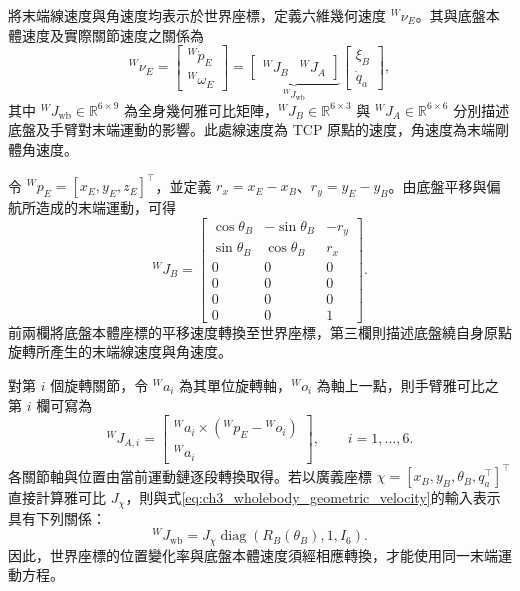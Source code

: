 將末端線速度與角速度均表示於世界座標，定義六維幾何速度 ${}^{W}\nu_E$。其與底盤本體速度及實際關節速度之關係為
\begin{equation}
    {}^{W}\nu_E
    =
    \begin{bmatrix}
        {}^{W}\dot{p}_E \\
        {}^{W}\omega_E
    \end{bmatrix}
    =
    \underbrace{
    \begin{bmatrix}
        {}^{W}J_B & {}^{W}J_A
    \end{bmatrix}}_{{}^{W}J_{\mathrm{wb}}}
    \begin{bmatrix}
        \xi_B \\
        \dot{q}_a
    \end{bmatrix},
    \label{eq:ch3_wholebody_geometric_velocity}
\end{equation}
其中 ${}^{W}J_{\mathrm{wb}}\in\mathbb{R}^{6\times 9}$ 為全身幾何雅可比矩陣，${}^{W}J_B\in\mathbb{R}^{6\times 3}$ 與 ${}^{W}J_A\in\mathbb{R}^{6\times 6}$ 分別描述底盤及手臂對末端運動的影響。此處線速度為 TCP 原點的速度，角速度為末端剛體角速度。

令 ${}^{W}p_E=[x_E,y_E,z_E]^{\top}$，並定義 $r_x=x_E-x_B$、$r_y=y_E-y_B$。由底盤平移與偏航所造成的末端運動，可得
\begin{equation}
    {}^{W}J_B=
    \begin{bmatrix}
        \cos\theta_B & -\sin\theta_B & -r_y \\
        \sin\theta_B & \cos\theta_B & r_x \\
        0 & 0 & 0 \\
        0 & 0 & 0 \\
        0 & 0 & 0 \\
        0 & 0 & 1
    \end{bmatrix}.
    \label{eq:ch3_base_geometric_jacobian}
\end{equation}
前兩欄將底盤本體座標的平移速度轉換至世界座標，第三欄則描述底盤繞自身原點旋轉所產生的末端線速度與角速度。

對第 $i$ 個旋轉關節，令 ${}^{W}a_i$ 為其單位旋轉軸，${}^{W}o_i$ 為軸上一點，則手臂雅可比之第 $i$ 欄可寫為
\begin{equation}
    {}^{W}J_{A,i}=
    \begin{bmatrix}
        {}^{W}a_i\times\left({}^{W}p_E-{}^{W}o_i\right) \\
        {}^{W}a_i
    \end{bmatrix},
    \qquad i=1,\ldots,6.
    \label{eq:ch3_arm_geometric_jacobian_column}
\end{equation}
各關節軸與位置由當前運動鏈逐段轉換取得。若以廣義座標 $\chi=[x_B,y_B,\theta_B,q_a^{\top}]^{\top}$ 直接計算雅可比 $J_{\chi}$，則與式\eqref{eq:ch3_wholebody_geometric_velocity}的輸入表示具有下列關係：
\begin{equation}
    {}^{W}J_{\mathrm{wb}}
    =J_{\chi}\operatorname{diag}\!\left(R_B(\theta_B),1,I_6\right).
    \label{eq:ch3_jacobian_velocity_coordinate_mapping}
\end{equation}
因此，世界座標的位置變化率與底盤本體速度須經相應轉換，才能使用同一末端運動方程。

